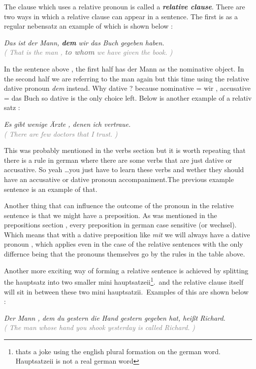 \documentclass[a4paper,twocolumn,10pt]{article}
\newcommand{\newpar}
{\par \vspace{0.3cm}}
\begin{document}
The clause which uses a relative pronoun is called a \textbf{\textit{relative
		clause}}.  There are two ways in which a relative clause can appear in a
sentence. The first is as a regular nebensatz an example of which is shown
below :\newpar

\noindent
\textit{Das ist der Mann, \textcolor{green-goethe}{\textbf{dem}} wir das Buch gegeben haben.}\\
\textcolor{gray} { \textit{( That is the man , \textbf{to whom} we have given the book. )} } \newpar

In the sentence above , the first half has der Mann as the nominative
object. In the second half we are referring to the man again but this time using
the relative dative pronoun \textit{dem} instead. Why dative ? because
nominative = wir , accusative = das Buch so dative is the only choice left.
Below is another example of a relativ satz :\newpar

\noindent
\textit{Es gibt wenige Ärzte , denen ich vertraue.}\\
\textcolor{gray} { \textit{( There are few doctors that I trust. )} } \newpar

This was probably mentioned in the verbs section but it is worth repeating that
there is a rule in german where there are some verbs that are just dative or
accusative. So yeah \ldots you just have to learn these verbs and wether they
should have an accusative or dative pronoun accompaniment.The previous example
sentence is an example of that.\newpar

Another thing that can influence the outcome of the pronoun in the relative
sentence is that we might have a preposition. As was mentioned in the
prepositions section , every preposition in german case sensitive (or wechsel).
Which means that with a dative preposition like \textit{mit} we will always have
a dative pronoun , which applies even in the case of the relative sentences with
the only differnce being that the pronouns themselves go by the rules in the
table above.\newpar

Another more exciting way of forming a relative sentence is achieved by
splitting the hauptsatz into two smaller mini hauptsatzeii\footnote{thats a joke
	using the english plural formation on the german word. Hauptsatzeii is not a
	real german word}.\ and the relative clause itself will sit in between these
two mini hauptsatzii.\ Examples of this are shown below :\newpar

\noindent
\textit{Der Mann , dem du gestern die Hand gestern gegeben hat, heißt Richard.}\\
\textcolor{gray} { \textit{( The man whose hand you shook yesterday is called
		Richard. )} } \newpar
\end{document}
